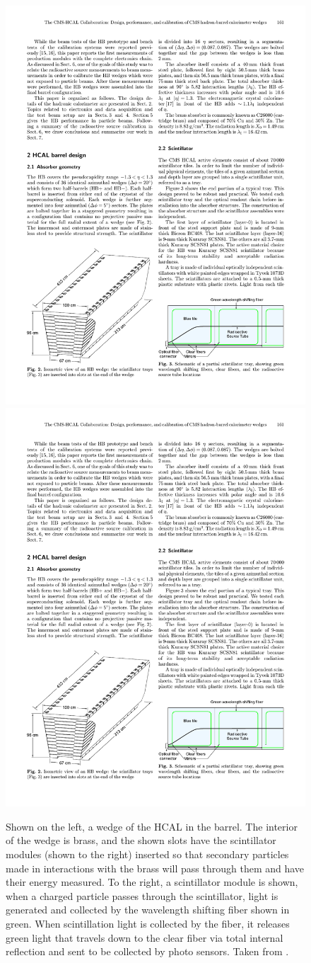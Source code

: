     \begin{figure}[h!]
      \centering
      \includegraphics[width=.45\textwidth]{figures/hcal_wedge.pdf}
      \includegraphics[width=.45\textwidth]{figures/hcal_scintillator.pdf}
      \caption{Shown on the left, a wedge of the HCAL in the barrel. The interior of the wedge is brass, and the shown slots have the scintillator modules (shown to the right) inserted so that secondary particles made in interactions with the brass will pass through them and have their energy measured. To the right, a scintillator module is shown, when a charged particle passes through the scintillator, light is generated and collected by the wavelength shifting fiber shown in green. When scintillation light is collected by the fiber, it releases green light that travels down to the clear fiber via total internal reflection and sent to be collected by photo sensors. Taken from \cite{cms_hcal_wedge}.}
      \label{fig:hcal_wedge}
    \end{figure}


